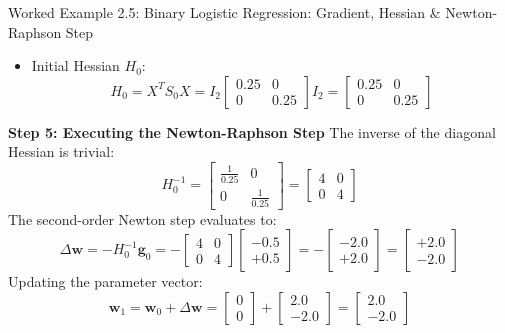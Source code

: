 \begin{examplebox}[breakable]{Worked Example 2.5: Binary Logistic Regression: Gradient, Hessian \& Newton-Raphson Step}
\begin{itemize}
    \item Initial Hessian $H_0$:
    \begin{equation*}
    H_0 = X^T S_0 X = I_2 \begin{bmatrix} 0.25 & 0 \\ 0 & 0.25 \end{bmatrix} I_2 = \begin{bmatrix} 0.25 & 0 \\ 0 & 0.25 \end{bmatrix}
    \end{equation*}
\end{itemize}

\textbf{Step 5: Executing the Newton-Raphson Step}
The inverse of the diagonal Hessian is trivial:
\begin{equation*}
H_0^{-1} = \begin{bmatrix} \frac{1}{0.25} & 0 \\ 0 & \frac{1}{0.25} \end{bmatrix} = \begin{bmatrix} 4 & 0 \\ 0 & 4 \end{bmatrix}
\end{equation*}
The second-order Newton step evaluates to:
\begin{equation*}
\Delta \mathbf{w} = -H_0^{-1} \mathbf{g}_0 = -\begin{bmatrix} 4 & 0 \\ 0 & 4 \end{bmatrix} \begin{bmatrix} -0.5 \\ +0.5 \end{bmatrix} = -\begin{bmatrix} -2.0 \\ +2.0 \end{bmatrix} = \begin{bmatrix} +2.0 \\ -2.0 \end{bmatrix}
\end{equation*}
Updating the parameter vector:
\begin{equation*}
\mathbf{w}_1 = \mathbf{w}_0 + \Delta \mathbf{w} = \begin{bmatrix} 0 \\ 0 \end{bmatrix} + \begin{bmatrix} 2.0 \\ -2.0 \end{bmatrix} = \mathbf{\begin{bmatrix} 2.0 \\ -2.0 \end{bmatrix}}
\end{equation*}


\end{examplebox}
